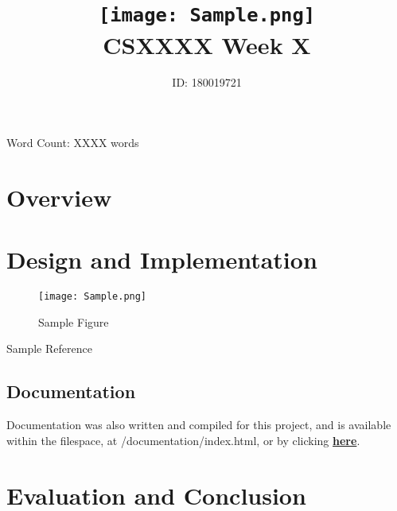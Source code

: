 \documentclass[hidelinks, a4paper]{article}
\title{\texttt{[image: Sample.png]} \\ CSXXXX Week X}
\author{ID: 180019721}
\begin{document}
 
\maketitle
\begin{center}
Word Count: XXXX words
\end{center}
\tableofcontents

\newpage

\section{Overview}

\section{Design and Implementation}

\begin{figure}[H]
\centering
\texttt{[image: Sample.png]}
\caption{Sample Figure}
\label{fig:image1}
\end{figure}

Sample Reference\cite{1}

\subsection{Documentation}
Documentation was also written and compiled for this project, and is available within the filespace, at /documentation/index.html, or by clicking \href{run:./documentation/index.html}{\textbf{here}}.

\section{Evaluation and Conclusion}

\newpage

\nocite{*}
\begingroup
\RaggedRight


\endgroup

\listoffigures
\end{document}

